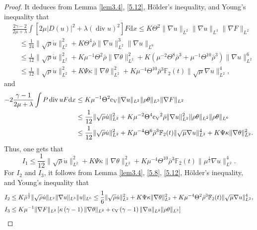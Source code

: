 \documentclass[11pt]{article}
\DeclareMathOperator{\divv}{div}
\begin{document}
\begin{proof}
It deduces from Lemma \ref{lem3.4}, \eqref{5.12}, H\"{o}lder's inequality, and Young's inequality that
\begin{align*}
& \frac{2\gamma - 2}{2 \mu + \lambda } \int \left[2 \mu |D(u)|^2 + \lambda(\divv u)^2 \right] F \mathrm{d} x \leq K \Theta^2 \|\nabla u\|_{L^2} \|\nabla u\|_{L^3} \|\nabla F\|_{L^2}\\
& \quad \leq \frac{1}{24} \|\sqrt \rho \dot{u}\|_{L^2}^2 + K \Theta^4 \bar{\rho} \|\nabla u\|_{L^2}^3 \|\nabla u\|_{L^6}\\
& \quad \leq \frac{1}{12} \|\sqrt \rho \dot{u}\|_{L^2}^2 + K \mu^{-1} \Theta^2 \bar{\rho} \|\nabla \theta \|_{L^2}^2 + K \left(\mu^{-2} \Theta^8 \bar{\rho}^3 + \mu^{-1} \Theta^{10} \bar{\rho}^3 \right) \|\nabla u\|_{L^2}^6\\
& \quad \leq \frac{1}{12} \|\sqrt \rho \dot{u}\|_{L^2}^2 + K \Psi \kappa \|\nabla \theta \|_{L^2}^2 + K \mu^{-4} \Theta^{10} \bar{\rho}^3 \mathbb{F}_2 (t) \|\sqrt{\mu}\nabla u\|_{L^2}^4,
\end{align*}
and
\begin{align*}
- 2 \frac{\gamma - 1}{2 \mu + \lambda } \int P\divv u F \mathrm{d} x
& \leq K \mu^{-1} \Theta^2 {\rm c_V} \|\nabla u\|_{L^2} \|\rho \theta \|_{L^3} \|\nabla F\|_{L^2}\\
& \leq \frac{1}{12} \|\sqrt \rho \dot{u}\|_{L^2}^2 + K \mu^{-2} \Theta^4 {\rm c_V}^2 \bar{\rho} \|\nabla u\|_{L^2}^2  \|\rho \theta \|_{L^2} \|\rho \theta \|_{L^6}\\
& \leq \frac{1}{12} \|\sqrt \rho \dot{u}\|_{L^2}^2 + K \mu^{-4} \Theta^6 \bar{\rho}^3 \mathbb{F}_2 (t) \|\sqrt{\mu}\nabla u\|_{L^2}^4 + K \Psi \kappa \|\nabla \theta \|_{L^2}^2.
\end{align*}
Thus, one gets that
$$
I_1 \leq \frac{1}{12} \|\sqrt \rho \dot{u}\|_{L^2}^2 + K \Psi \kappa \|\nabla \theta \|_{L^2}^2 + K \mu^{-4} \Theta^{10} \bar{\rho}^3 \mathbb{F}_2 (t) \|\mu^{\frac{1}{2}} \nabla u\|_{L^2}^4.
$$
For $I_2$ and $I_3$, it follows from Lemma \ref{lem3.4}, \eqref{5.8}, \eqref{5.12}, H\"{o}lder's inequality, and Young's inequality that
\begin{align*}
I_2
& \leq K \bar{\rho}^{\frac{1}{2}} \|\sqrt \rho \dot{u}\|_{L^2} \|\nabla u\|_{L^3} \|u\|_{L^6} \leq \frac{1}{6} \|\sqrt \rho \dot{u}\|_{L^2}^2 + K \Psi \kappa \|\nabla \theta \|_{L^2}^2 + K \mu^{-4} \Theta^2 \bar{\rho}^3 \mathbb{F}_2 (t) \|\sqrt{\mu}\nabla u\|_{L^2}^4,\\
I_3
& \leq K \mu^{-1} \|\nabla F\|_{L^2}  \left[ \kappa \left(\gamma - 1 \right)\|\nabla \theta \|_{L^2} + {\rm c_V} \left( \gamma - 1\right) \|\nabla u\|_{L^2} \|\rho \theta \|_{L^3} \right]\\

\end{align*}
\end{proof}
\end{document}
